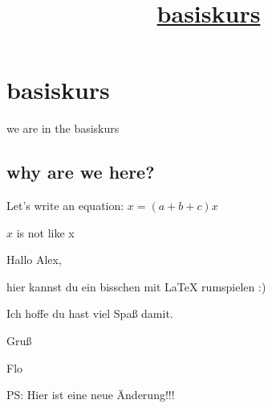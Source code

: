 \documentclass[11pt]{scrartcl}
\begin{document}
\title{\underline{basiskurs}}
\maketitle
\section{basiskurs}
we are in the basiskurs
\subsection{why are we here?}
Let's write an equation: $x = (a + b + c) x$

$x$ is not like x


Hallo Alex,

hier kannst du ein bisschen mit LaTeX rumspielen :)

Ich hoffe du hast viel Spaß damit.

Gruß

Flo 
 
PS: Hier ist eine neue Änderung!!!
\end{document}
